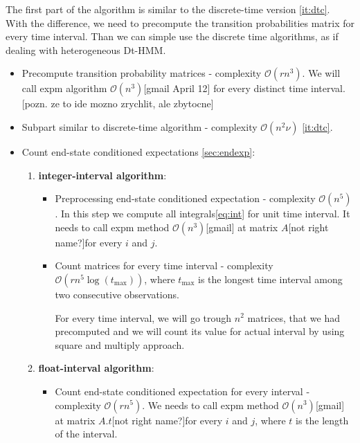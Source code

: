 \documentclass[thesis=M,english]{FITthesis}[2012/10/20]
\begin{document}
\begin{itemize}
The first part of the algorithm is similar to the discrete-time version \ref{it:dtc}. With the difference, we need to precompute the transition probabilities matrix for every time interval. Than we can simple use the discrete time algorithms, as if dealing with heterogeneous Dt-HMM. 

\begin{itemize}\label{it:ctc}
\item Precompute transition probability matrices - complexity $\mathcal{O}(r n^3)$. We will call expm algorithm $\mathcal{O}(n^3)$[gmail April 12] for every distinct time interval. [pozn. ze to ide mozno zrychlit, ale zbytocne]
\item Subpart similar to discrete-time algorithm - complexity $\mathcal{O}(n^2 \nu)$ \ref{it:dtc}.
\item 

Count end-state conditioned expectations \ref{sec:endexp}:
\begin{enumerate}[resume]
\setcounter{enumi}{0}
\item \textbf{integer-interval algorithm}:

\begin{itemize}
\item Preprocessing end-state conditioned expectation - complexity $\mathcal{O}(n^5)$. 
    In this step we compute all integrals\eqref{eq:int} for unit time interval. It needs to call expm method $\mathcal{O}(n^3)$[gmail] at matrix $A$[not right name?]for every $i$ and $j$.   
\item Count matrices for every time interval - complexity $\mathcal{O}(r n^5\log(t_{\max}))$, where $t_{\max}$ is the longest time interval among two consecutive observations.

For every time interval, we will go trough $n^2$ matrices, that we had precomputed and we will count its value for actual interval by using square and multiply approach. 


\end{itemize}

\item \textbf{float-interval algorithm}: 
\begin{itemize}
\item Count end-state conditioned expectation for every interval - complexity $\mathcal{O}(r n^5)$. 
We needs to call expm method $\mathcal{O}(n^3)$[gmail] at matrix $A.t$[not right name?]for every $i$ and $j$, where $t$ is the length of the interval.
\end{itemize}


\end{enumerate}
\end{itemize}
\end{itemize}
\end{document}
